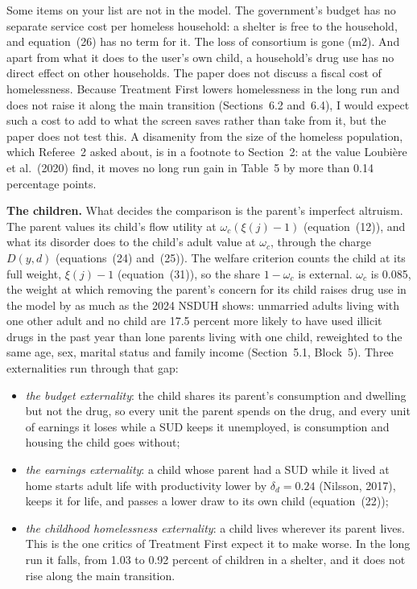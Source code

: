 \documentclass[11pt]{article}
\begin{document}
\begin{response}
\open Some items on your list are not in the model. The government's budget has no
separate service cost per homeless household: a shelter is free to the household, and
equation~(26) has no term for it. The loss of consortium is gone (m2). And apart from
what it does to the user's own child, a household's drug use has no direct effect on
other households. The paper does not discuss a fiscal cost of homelessness. Because
Treatment First lowers homelessness in the long run and does not raise it along the
main transition (Sections~6.2 and~6.4), I would expect such a cost to add to what the
screen saves rather than take from it, but the paper does not test this. A disamenity
from the size of the homeless population, which Referee~2 asked about, is in a footnote
to Section~2: at the value Loubi\`ere et al.\ (2020) find, it moves no long run gain in
Table~5 by more than 0.14 percentage points.

\textbf{The children.} What decides the comparison is the parent's imperfect altruism.
The parent values its child's flow utility at $\omega_c(\xi(j)-1)$ (equation~(12)), and
what its disorder does to the child's adult value at $\omega_c$, through the charge
$D(y,d)$ (equations~(24) and~(25)). The welfare criterion counts the child at its full
weight, $\xi(j)-1$ (equation~(31)), so the share $1-\omega_c$ is external. $\omega_c$
is 0.085, the weight at which removing the parent's concern for its child raises drug
use in the model by as much as the 2024 NSDUH shows: unmarried adults living with one
other adult and no child are 17.5 percent more likely to have used illicit drugs in the
past year than lone parents living with one child, reweighted to the same age, sex,
marital status and family income (Section~5.1, Block~5). Three externalities run
through that gap:
\begin{itemize}
\item \emph{the budget externality}: the child shares its parent's consumption and
dwelling but not the drug, so every unit the parent spends on the drug, and every unit
of earnings it loses while a SUD keeps it unemployed, is consumption and housing the
child goes without;
\item \emph{the earnings externality}: a child whose parent had a SUD while it lived at
home starts adult life with productivity lower by $\delta_d=0.24$ (Nilsson, 2017),
keeps it for life, and passes a lower draw to its own child (equation~(22));
\item \emph{the childhood homelessness externality}: a child lives wherever its parent
lives. This is the one critics of Treatment First expect it to make worse. In the long run
it falls, from 1.03 to 0.92 percent of children in a shelter, and it does not rise
along the main transition.
\end{itemize}


\end{response}
\end{document}

